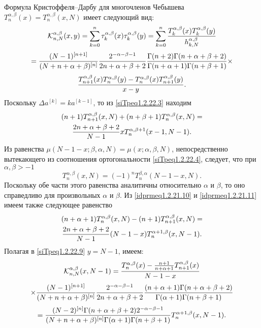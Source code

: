 Формула Кристоффеля--Дарбу  для многочленов Чебышева
$T_n^{\alpha,\beta}(x)=T_n^{\alpha,\beta}(x,N)$ имеет следующий вид:
$$
\mathcal{K}_{n,N}^{\alpha,\beta}(x,y)=\sum_{k=0}^n\tau_k^{\alpha,\beta}(x)\tau_k^{\alpha,\beta}(y)=
\sum_{k=0}^n{T_k^{\alpha,\beta}(x)T_k^{\alpha,\beta}(y)\over
h_{k,N}^{\alpha,\beta}} $$ $$ ={(N-1)^{[n+1]}\over
(N+n+\alpha+\beta)^{[n]}} {2^{-\alpha-\beta-1}\over
2n+\alpha+\beta+2} {\Gamma(n+2)\Gamma(n+\alpha+\beta+2)\over
\Gamma(n+\alpha+1)\Gamma(n+\beta+1)}\times
$$
\begin{equation}\label{siTpeq1.2.22.9}
{T_{n+1}^{\alpha,\beta}(x)T_n^{\alpha,\beta}(y)-
T_n^{\alpha,\beta}(x)T_{n+1}^{\alpha,\beta}(y)\over x-y}.
\end{equation}
Поскольку $\Delta a^{[k]}=ka^{[k-1]}$, то из \eqref{siTpeq1.2.22.3} находим
 \begin{multline}\label{siTpeq1.2.22.10}
(n+1)T_{n+1}^{\alpha,\beta}(x,N)+(n+\beta+1)T_n^{\alpha, \beta}(x,N)=\\
{2n+\alpha+\beta+2\over N-1}xT_n^{\alpha,\beta+1}(x-1,N-1).
 \end{multline}
 Из равенства $\mu(N-1-x;\beta,\alpha,N)=\mu(x;\alpha,\beta,N)$, непосредственно
вытекающего из  соотношения ортогональности \eqref{siTpeq1.2.22.4}, следует,
что при $\alpha,\beta>-1$
 \begin{equation}\label{siTpeq1.2.22.11}
T_n^{\alpha,\beta}(x,N)=(-1)^nT_n^{\beta,\alpha}(N-1-x,N).
 \end{equation}
  Поскольку обе части этого равенства аналитичны
относительно $\alpha$ и $\beta$, то оно справедливо для произвольных
$\alpha$ и $\beta$. Из \eqref{idprmeq1.2.21.10} и \eqref{idprmeq1.2.21.11} имеем также следующее
     равенство
\begin{multline}\label{siTpeq1.2.22.12}
(n+\alpha+1)T_n^{\alpha,\beta}(x,N)-(n+1)T_{n+1}^{\alpha,\beta}(x,N)=\\
{2n+\alpha+\beta+2\over   N-1}(N-1-x)T_n^{\alpha+1,
\beta}(x,N-1).
\end{multline}
 Полагая в \eqref{siTpeq1.2.22.9} $y=N-1$, имеем:
  $$
\mathcal{K}_{n,N}^{\alpha,\beta}(x,N-1)=
{T_n^{\alpha,\beta}(x)-{n+1\over n+\alpha+1}
T_{n+1}^{\alpha,\beta}(x)\over N-1-x}
     $$
     $$
\times {(N-1)^{[n+1]}\over (N+n+\alpha+\beta)^{[n]}}
{2^{-\alpha-\beta-1}\over 2n+\alpha+\beta+2}
{(n+\alpha+1)\Gamma(n+\alpha+\beta+2)\over
\Gamma(\alpha+1)\Gamma(n+\beta+1)} $$
\begin{equation}\label{siTpeq1.2.22.13}
={(N-2)^{[n]}\Gamma(n+\alpha+\beta+2)2^{-\alpha-\beta-1}\over
(N+n+\alpha+\beta)^{[n]}\Gamma(\alpha+1)\Gamma(n+\beta+1)}
T_n^{\alpha+1,\beta}(x,N-1).
\end{equation}
